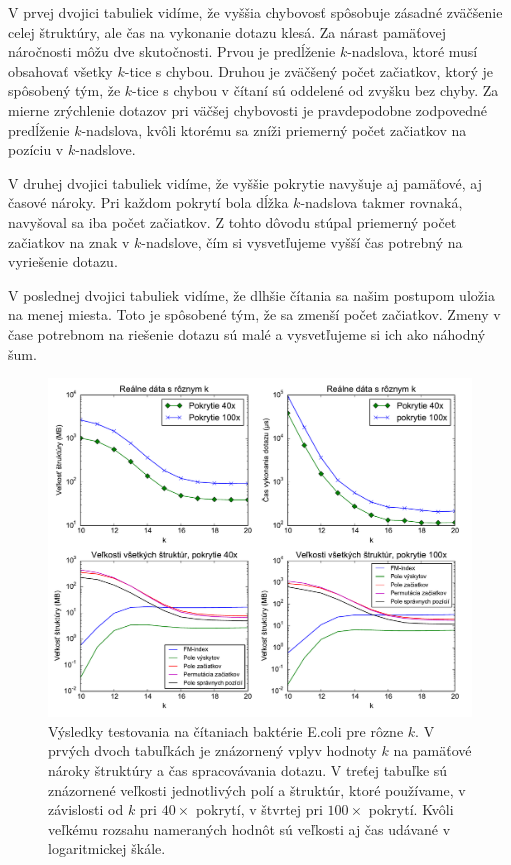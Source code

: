 V prvej dvojici
tabuliek vidíme, že vyššia chybovosť spôsobuje zásadné zväčšenie celej štruktúry, ale
čas na vykonanie dotazu klesá. Za nárast pamäťovej náročnosti môžu dve skutočnosti. Prvou
je predĺženie $k$-nadslova, ktoré musí obsahovať všetky $k$-tice s chybou. Druhou je zväčšený
počet začiatkov, ktorý je spôsobený tým, že $k$-tice s chybou v čítaní sú oddelené od zvyšku
bez chyby. Za mierne zrýchlenie dotazov pri väčšej chybovosti je pravdepodobne zodpovedné
predĺženie $k$-nadslova, kvôli ktorému sa zníži priemerný počet začiatkov na pozíciu
v $k$-nadslove.

V druhej dvojici tabuliek vidíme, že vyššie pokrytie navyšuje aj pamäťové, aj časové nároky.
Pri každom pokrytí bola dĺžka $k$-nadslova takmer rovnaká, navyšoval sa iba počet začiatkov.
Z tohto dôvodu stúpal priemerný počet začiatkov na znak v $k$-nadslove, čím si vysvetľujeme
vyšší čas potrebný na vyriešenie dotazu.

V poslednej dvojici tabuliek vidíme, že dlhšie čítania sa našim postupom uložia na menej
miesta. Toto je spôsobené tým, že sa zmenší počet začiatkov. Zmeny v čase potrebnom na
riešenie dotazu sú malé a vysvetľujeme si ich ako náhodný šum.

\begin{figure}

\centerline{\includegraphics[width=1\textwidth]{images/chart_difks.pdf}}

\caption[E.coli dáta s rôznym $k$]{Výsledky testovania na čítaniach baktérie E.coli pre rôzne $k$.
V prvých dvoch tabuľkách je znázornený vplyv hodnoty $k$ na
pamäťové nároky štruktúry a čas spracovávania dotazu. V treťej tabuľke sú znázornené veľkosti
jednotlivých polí a štruktúr, ktoré používame, v závislosti od $k$ pri $40\times$ pokrytí,
v štvrtej pri $100\times$ pokrytí. Kvôli veľkému rozsahu nameraných hodnôt sú veľkosti
aj čas udávané v logaritmickej škále.}

\label{chart:difks}

\end{figure}

